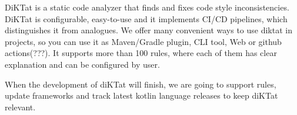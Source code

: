 \par DiKTat is a static code analyzer that finds and fixes code style inconsistencies. DiKTat is configurable, easy-to-use and it implements CI/CD pipelines, which distinguishes it from analogues. We offer many convenient ways to use diktat in projects, so you can use it as Maven/Gradle plugin, CLI tool, Web or github actions(???). It supports more than 100 rules, where each of them has clear explanation and can be configured by user.
\par When the development of diKTat will finish, we are going to support rules, update frameworks and track latest kotlin language releases to keep diKTat relevant.